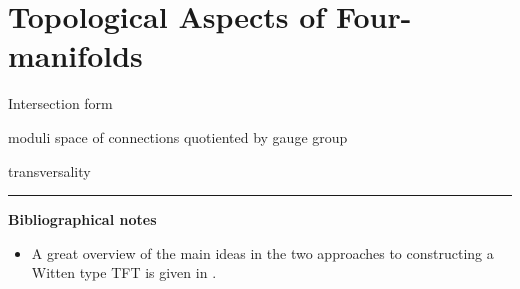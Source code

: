 \section{Topological Aspects of Four-manifolds}
Intersection form

moduli space of connections quotiented by gauge group

transversality

\vspace{5mm}
\hrule 
\vspace{5mm}

\textbf{Bibliographical notes}
{\small
\begin{itemize}
	\item A great overview of the main ideas in the two approaches to
		constructing a Witten type TFT is given in \citet{TQFTbook}.
\end{itemize}
}
